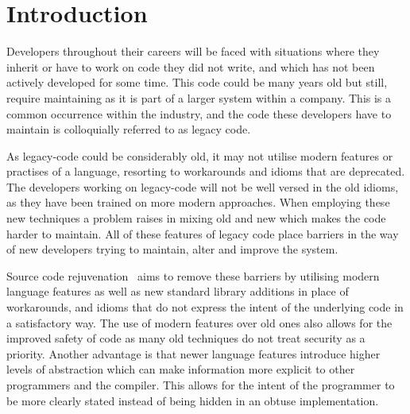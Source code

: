 \documentclass[bsc,frontabs,singlespacing,twoside,parskip,deptreport]{infthesis}
\begin{document}
\chapter{Introduction} \label{Introduction}



Developers throughout their careers will be faced with situations where they inherit or have to work on code they did not write, and which has not been actively developed for some time. This code could be many years old but still, require maintaining as it is part of a larger system within a company. This is a common occurrence within the industry, and the code these developers have to maintain is colloquially referred to as legacy code. 

As legacy-code could be considerably old, it may not utilise modern features or practises of a language, resorting to workarounds and idioms that are deprecated. The developers working on legacy-code will not be well versed in the old idioms, as they have been trained on more modern approaches. When employing these new techniques a problem raises in mixing old and new which makes the code harder to maintain. All of these features of legacy code place barriers in the way of new developers trying to maintain, alter and improve the system. 


    
Source code rejuvenation~\cite{STROUSTRUP_REJUV} aims to remove these barriers by utilising modern language features as well as new standard library additions in place of workarounds, and idioms that do not express the intent of the underlying code in a satisfactory way. The use of modern features over old ones also allows for the improved safety of code as many old techniques do not treat security as a priority. Another advantage is that newer language features introduce higher levels of abstraction which can make information more explicit to other programmers and the compiler. This allows for the intent of the programmer to be more clearly stated instead of being hidden in an obtuse implementation. 
\end{document}
